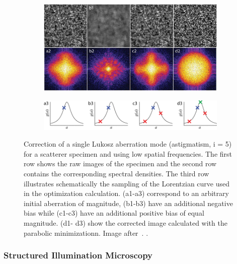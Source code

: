 \begin{figure}[tbh]
        \centering
        \begin{subfigure}[b]{0.8\textwidth}
                \includegraphics[width=\textwidth]{images/wide_parabolic_opti_images}
                \label{fig:para_opt_images}
        \end{subfigure}
        \begin{subfigure}[b]{0.8\textwidth}
                \includegraphics[width=\textwidth]{images/wide_parabolic_opti_graphs}
                \label{fig:para_opt_graphs}
        \end{subfigure}								
        \caption{Correction of a single Lukosz aberration mode (astigmatism, i = 5) for a scatterer specimen and using low spatial frequencies. The first row shows the raw images of the specimen and the second row contains the corresponding spectral densities. The third row illustrates schematically the sampling of the Lorentzian curve used in the optimization calculation. (a1-a3) correspond to an arbitrary initial aberration of magnitude, (b1-b3) have an additional negative bias while (c1-c3) have an additional positive bias of equal magnitude. (d1- d3) show the corrected image calculated with the parabolic minimizationn. Image after~\cite{wide_AOM_loew_freq}.
.}
\label{fig:para_opt}
\end{figure} 


\subsubsection{Structured Illumination Microscopy}
\label{sec:StructuredIlluminationMicroscopy}

